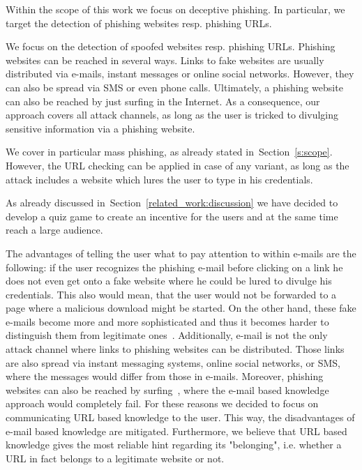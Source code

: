 \begin{description}[leftmargin=0cm]
	\item[Deceptive Phishing as Phishing Technique] Within the scope of this work we focus on deceptive phishing.
 In particular, we target the detection of phishing websites resp. phishing URLs.
 
	\item[Several Attack Channels] We focus on the detection of spoofed websites resp. phishing URLs.
 Phishing websites can be reached in several ways.
 Links to fake websites are usually distributed via e-mails, instant messages or online social networks.
 However, they can also be spread via SMS or even phone calls.
 Ultimately, a phishing website can also be reached by just surfing in the Internet.
 As a consequence, our approach covers all attack channels, as long as the user is tricked to divulging sensitive information via a phishing website.

	\item[Mass Phishing as Variation of Phishing] We cover in particular mass phishing, as already stated in~Section~\ref{s:scope}.
 However, the URL checking can be applied in case of any variant, as long as the attack includes a website which lures the user to type in his credentials.

	\item[Game and Quiz Based Learning as Communication Medium] As already discussed in~Section~\ref{related_work:discussion} we have decided to develop a quiz game to create an incentive for the users and at the same time reach a large audience. 

	\item[URL Based Knowledge as Learning Content] The advantages of telling the user what to pay attention to within e-mails are the following: if the user recognizes the phishing e-mail before clicking on a link he does not even get onto a fake website where he could be lured to divulge his credentials.
 This also would mean, that the user would not be forwarded to a page where a malicious download might be started.
 On the other hand, these fake e-mails become more and more sophisticated and thus it becomes harder to distinguish them from legitimate ones~\cite{microsoftphishing, spamfighter}. Additionally, e-mail is not the only attack channel where links to phishing websites can be distributed.
  Those links are also spread via instant messaging systems, online social networks, or SMS, where the messages would differ from those in e-mails.
 Moreover, phishing websites can also be reached by surfing~\cite{kasperskyreport2013}, where the e-mail based knowledge approach would completely fail.
 For these reasons we decided to focus on communicating URL based knowledge to the user.
 This way, the disadvantages of e-mail based knowledge are mitigated.
 Furthermore, we believe that URL based knowledge gives the most reliable hint regarding its "belonging", i.e. whether a URL in fact belongs to a legitimate website or not.


\end{description}
